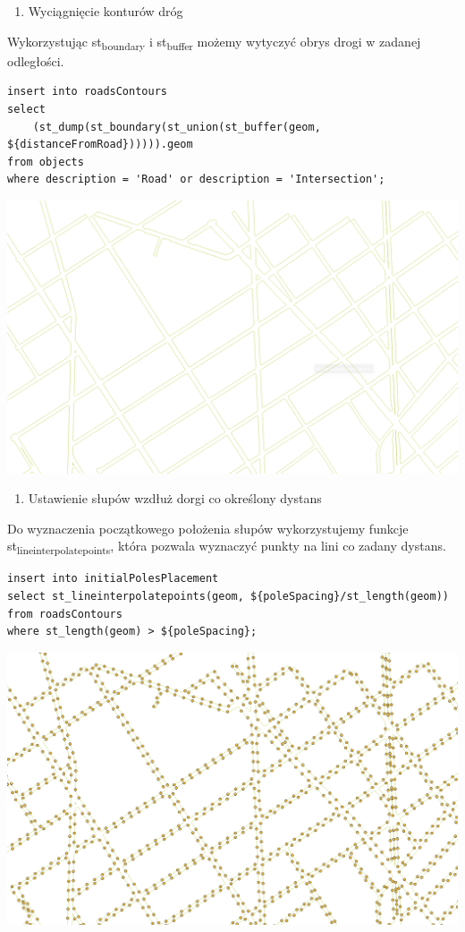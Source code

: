 \documentclass[11pt]{article}
\begin{document}
\begin{enumerate}
\item Wyciągnięcie konturów dróg
\end{enumerate}

Wykorzystując st\textsubscript{boundary} i st\textsubscript{buffer} możemy wytyczyć obrys drogi w zadanej odległości.

\begin{verbatim}
insert into roadsContours
select
    (st_dump(st_boundary(st_union(st_buffer(geom, ${distanceFromRoad}))))).geom
from objects
where description = 'Road' or description = 'Intersection';
\end{verbatim}

\begin{center}
\includegraphics[width=.9\linewidth]{./img/2.png}
\end{center}



\begin{enumerate}
\item Ustawienie słupów wzdłuż dorgi co określony dystans
\end{enumerate}

Do wyznaczenia początkowego położenia słupów wykorzystujemy funkcje st\textsubscript{lineinterpolatepoints}, która pozwala wyznaczyć punkty na lini co zadany dystans. 

\begin{verbatim}
insert into initialPolesPlacement 
select st_lineinterpolatepoints(geom, ${poleSpacing}/st_length(geom)) 
from roadsContours 
where st_length(geom) > ${poleSpacing};
\end{verbatim}

\begin{center}
\includegraphics[width=.9\linewidth]{./img/3.png}
\end{center}
\end{document}
